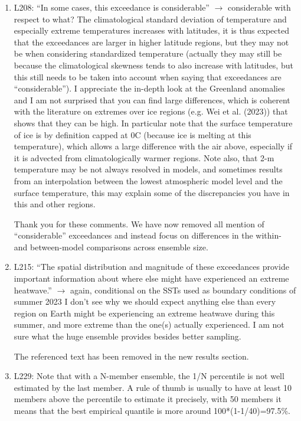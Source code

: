 \documentclass[11pt]{article}
\newcommand{\newTxt}{\textcolor{cadmiumgreen}}
\begin{document}
\begin{enumerate}
    \item L208: “In some cases, this exceedance is considerable” $\rightarrow$ considerable with respect to what? The climatological standard deviation of temperature and especially extreme temperatures increases with latitudes, it is thus expected that the exceedances are larger in higher latitude regions, but they may not be when considering standardized temperature (actually they may still be because the climatological skewness tends to also increase with latitudes, but this still needs to be taken into account when saying that exceedances are “considerable”). I appreciate the in-depth look at the Greenland anomalies and I am not surprised that you can find large differences, which is coherent with the literature on extremes over ice regions (e.g. Wei et al. (2023)) that shows that they can be high. In particular note that the surface temperature of ice is by definition capped at 0C (because ice is melting at this temperature), which allows a large difference with the air above, especially if it is advected from climatologically warmer regions. Note also, that 2-m temperature may be not always resolved in models, and sometimes results from an interpolation between the lowest atmospheric model level and the surface temperature, this may explain some of the discrepancies you have in this and other regions.

    \newTxt{Thank you for these comments. We have now removed all mention of ``considerable'' exceedances and instead focus on differences in the within- and between-model comparisons across ensemble size.}
    
    \item L215: “The spatial distribution and magnitude of these exceedances provide important information about where else might have experienced an extreme heatwave.” $\rightarrow$ again, conditional on the SSTs used as boundary conditions of summer 2023 I don’t see why we should expect anything else than every region on Earth might be experiencing an extreme heatwave during this summer, and more extreme than the one(s) actually experienced. I am not sure what the huge ensemble provides besides better sampling.

    \newTxt{The referenced text has been removed in the new results section.}
    
    \item L229: Note that with a N-member ensemble, the 1/N percentile is not well estimated by the last member. A rule of thumb is usually to have at least 10 members above the percentile to estimate it precisely, with 50 members it means that the best empirical quantile is more around 100*(1-1/40)=97.5\%.


\end{enumerate}
\end{document}
